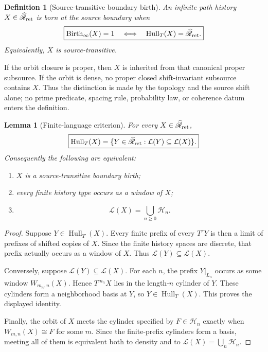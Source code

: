 \documentclass[11pt]{article}
\newtheorem{lemma}[theorem]{Lemma}
\newtheorem{definition}[theorem]{Definition}
\newcommand{\Birth}{\operatorname{Birth}}
\begin{document}
\begin{definition}[Source-transitive boundary birth]
\label{def:source-transitive-birth}
An infinite path history \(X\in\widehat{\mathscr R}_{\rm ret}\) is
\emph{born at the source boundary} when
\[
\boxed{
\Birth_\infty(X)=1
\quad\Longleftrightarrow\quad
\operatorname{Hull}_T(X)
=
\widehat{\mathscr R}_{\rm ret}.}
\]
Equivalently, \(X\) is source-transitive.
\end{definition}

If the orbit closure is proper, then \(X\) is inherited from that canonical
proper subsource.  If the orbit is dense, no proper closed shift-invariant
subsource contains \(X\).  Thus the distinction is made by the topology and
the source shift alone; no prime predicate, spacing rule, probability law, or
coherence datum enters the definition.

\begin{lemma}[Finite-language criterion]
\label{lem:finite-language-criterion}
For every \(X\in\widehat{\mathscr R}_{\rm ret}\),
\[
\boxed{
\operatorname{Hull}_T(X)
=
\{Y\in\widehat{\mathscr R}_{\rm ret}:
  \mathcal L(Y)\subseteq\mathcal L(X)\}.}
\]
Consequently the following are equivalent:
\begin{enumerate}[label=(\roman*)]
\item \(X\) is a source-transitive boundary birth;
\item every finite history type occurs as a window of \(X\);
\item
\[
\mathcal L(X)=\bigcup_{n\ge0}\mathscr H_n.
\]
\end{enumerate}
\end{lemma}

\begin{proof}
Suppose \(Y\in\operatorname{Hull}_T(X)\).  Every finite prefix of every
\(T^rY\) is then a limit of prefixes of shifted copies of \(X\).  Since the
finite history spaces are discrete, that prefix actually occurs as a window
of \(X\).  Thus \(\mathcal L(Y)\subseteq\mathcal L(X)\).

Conversely, suppose \(\mathcal L(Y)\subseteq\mathcal L(X)\).  For each \(n\),
the prefix \(Y|_{L_n}\) occurs as some window \(W_{m_n,n}(X)\).  Hence
\(T^{m_n}X\) lies in the length-\(n\) cylinder of \(Y\).  These cylinders form
a neighborhood basis at \(Y\), so \(Y\in\operatorname{Hull}_T(X)\).  This
proves the displayed identity.

Finally, the orbit of \(X\) meets the cylinder specified by
\(F\in\mathscr H_n\) exactly when \(W_{m,n}(X)\cong F\) for some \(m\).
Since the finite-prefix cylinders form a basis, meeting all of them is
equivalent both to density and to
\(\mathcal L(X)=\bigcup_n\mathscr H_n\).
\end{proof}
\end{document}

